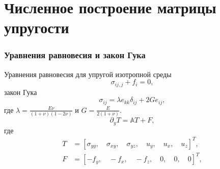 \section{Численное построение матрицы упругости}
\begin{frame}
    \frametitle{Уравнения равновесия и закон Гука}
    Уравнения равновесия для упругой изотропной среды 
    \begin{equation}
        \label{eq:equilibrium}
        \sigma_{ij,j} + f_i = 0,
    \end{equation}
    закон Гука
    \begin{equation}		
        \sigma_{ij} = \lambda e_{kk}\delta_{ij} + 2G e_{ij},
        \label{eq:hooke_law}
    \end{equation}
    где $\lambda = \frac{E \nu}{(1+\nu)(1-2\nu)}$ и $ G = \frac{E}{2(1+\nu)} $.
    \begin{equation}
        \label{eq:separate}
        \partial_{y} T = \mathbb{A}T + F,
    \end{equation}
    где
    \begin{equation}
        \label{eq:T}
        \begin{split}
            T &= \left[\sigma_{yy} , \quad \sigma_{xy} , \quad \sigma_{yz} , \quad u_{y} , \quad u_{x} , \quad u_{z}\right]^T, \\
            F &= \left[-f_y , \quad -f_x , \quad -f_z , \quad 0 , \quad 0 , \quad 0\right]^T,
        \end{split}
    \end{equation}
\end{frame}


